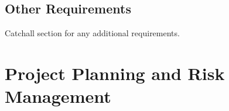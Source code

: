 \documentclass[titlepage]{article}
\begin{document}
\subsection{Other Requirements}
Catchall section for any additional requirements.

\section{Project Planning and Risk Management}

\def \Ta {\shortstack{Existing \\ Computer Vision \\ Libraries}}
\def \TaAlt {Research Libraries}

\def \Tb {\shortstack{Learn \\ Dependent \\ APIs}}
\def \TbAlt {Learn API}

\def \Tc {\shortstack{Database \\ Design}}
\def \TcAlt {Database Design}

\def \Td {\shortstack{Software \\ Design}}
\def \TdAlt {Software Design}

\def \Te {\shortstack{Database \\ Development}}
\def \TeAlt {Database Dev.}

\def \Tf {\shortstack{Software \\ Development}}
\def \TfAlt {Software Dev.}

\def \Tg {\shortstack{Analysis \\ and \\ Testing}}
\def \TgAlt {Analysis/Testing}

\def \Th {\shortstack{User \\ Feedback}}
\def \ThAlt {User Feedback}

\def \Y {2014}
\def \Da {00/00}
\def \Db {00/00}
\def \Dc {00/00}
\def \Dd {00/00}
\def \De {00/00}
\def \Df {00/00}
\def \Dg {00/00}
\def \Dh {00/00}
\end{document}
